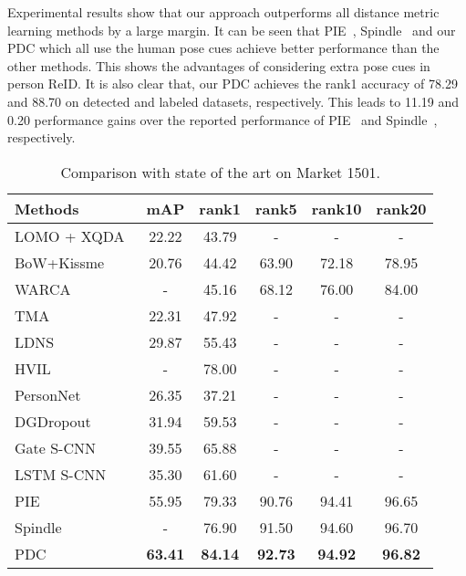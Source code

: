 \documentclass[10pt,twocolumn,letterpaper]{article}
\begin{document}
Experimental results show that our approach outperforms all distance metric learning methods by a large margin.
It can be seen that PIE~\cite{zheng2017pose}, Spindle~\cite{zhao2017spindle} and our PDC which all use the human pose cues achieve better performance than the other methods. This shows the advantages of considering extra pose cues in person ReID.
It is also clear that, our PDC achieves the rank1 accuracy of 78.29 and 88.70 on detected and labeled datasets, respectively. This leads to 11.19 and 0.20 performance gains over the reported performance of PIE~\cite{zheng2017pose} and Spindle~\cite{zhao2017spindle}, respectively.


\begin{table}
\caption{Comparison with state of the art on {Market 1501}.}
\vspace{-2mm}
\label{table:market}
\footnotesize
\begin{center}
\begin{tabular}{|l|ccccc|}
\hline
 Methods         &mAP      &rank1    &rank5    &rank10   &rank20 \\
\hline
LOMO + XQDA~\cite{liao2015person} &22.22    &43.79   &-    &- &- \\
BoW+Kissme~\cite{zheng2015scalable}       &20.76    &44.42    &63.90    &72.18    &78.95    \\
WARCA~\cite{jose2016scalable}   &-    &45.16    &68.12    &76.00    &84.00      \\
TMA~\cite{martinel2016temporal}&22.31&47.92&-&-&- \\
LDNS~\cite{zhang2016learning}       &29.87    &55.43    &-    &-    &-\\
HVIL~\cite{wang2016human}&-&78.00&-&-&-\\

\hline
PersonNet~\cite{wu2016personnet}      &26.35    &37.21   &-   &-&-\\
DGDropout~\cite{xiao2016learning}     &31.94    &59.53    &-    &-    &-\\
Gate S-CNN~\cite{varior2016gated}     &39.55    &65.88   &-   &-&-\\
LSTM S-CNN~\cite{varior2016siamese}   &35.30    &61.60    &-    &-    &-\\
\hline
PIE~\cite{zheng2017pose}  &55.95   &79.33   &90.76   &94.41   &96.65\\
Spindle~\cite{zhao2017spindle}   &-   &76.90  &91.50   &94.60   &96.70\\
\hline
PDC     &{\bf63.41}   &{\bf84.14}   &{\bf92.73}   &{\bf94.92}   &{\bf96.82}\\
\hline
\end{tabular}
\end{center}
\vspace{-6mm}
\end{table}
\end{document}
